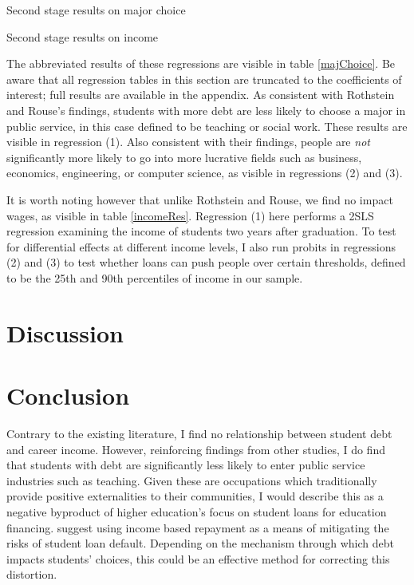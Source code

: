 \documentclass{article}
\newcommand{\regs}{../Analysis/Regressions/Output/}
\begin{document}
	\begin{table}
		\centering
		\caption{Second stage results on major choice}		
		
		\label{majChoice}
	\end{table}

	\begin{table}
		\centering
		\caption{Second stage results on income}		
		
		\label{incomeRes}
	\end{table}
	
	The abbreviated results of these regressions are visible in table \ref{majChoice}. Be aware that all regression tables in this section are truncated to the coefficients of interest; full results are available in the appendix. As consistent with Rothstein and Rouse's findings, students with more debt are less likely to choose a major in public service, in this case defined to be teaching or social work. These results are visible in regression (1). Also consistent with their findings, people are \emph{not} significantly more likely to go into more lucrative fields such as business, economics, engineering, or computer science, as visible in regressions (2) and (3). 
	
	It is worth noting however that unlike Rothstein and Rouse, we find no impact wages, as visible in table \ref{incomeRes}. Regression (1) here performs a 2SLS regression examining the income of students two years after graduation. To test for differential effects at different income levels, I also run probits in regressions (2) and (3) to test whether loans can push people over certain thresholds, defined to be the 25th and 90th percentiles of income in our sample. 
	
	\section{Discussion}
	
	\blindtext
	
	\section{Conclusion}
	
	Contrary to the existing literature, I find no relationship between student debt and career income. However, reinforcing findings from other studies, I do find that students with debt are significantly less likely to enter public service industries such as teaching. Given these are occupations which traditionally provide positive externalities to their communities, I would describe this as a negative byproduct of higher education's focus on student loans for education financing. \textcite{abraham2018} suggest using income based repayment as a means of mitigating the risks of student loan default. Depending on the mechanism through which debt impacts students' choices, this could be an effective method for correcting this distortion.
	
\end{document}
